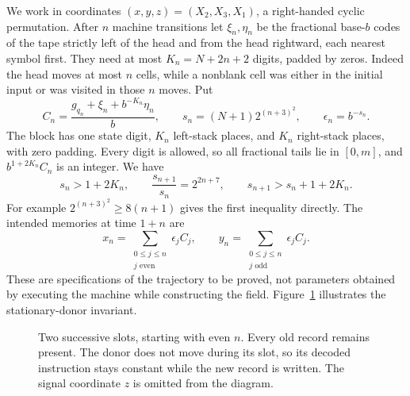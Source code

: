 We work in coordinates $(x,y,z)=(X_2,X_3,X_1)$, a right-handed cyclic
permutation.  After $n$ machine transitions let $\xi_n,\eta_n$ be the
fractional base-$b$ codes of the tape strictly left of the head and from
the head rightward, each nearest symbol first.  They need at most
$K_n=N+2n+2$ digits, padded by zeros.  Indeed the head moves at most
$n$ cells, while a nonblank cell was either in the initial input or was
visited in those $n$ moves.  Put
\begin{equation}
 C_n=\frac{g_{q_n}+\xi_n+b^{-K_n}\eta_n}{b},\qquad
 s_n=(N+1)2^{(n+3)^2},\qquad \epsilon_n=b^{-s_n}.
 \label{eq:alternating-block}
\end{equation}
The block has one state digit, $K_n$ left-stack places, and $K_n$
right-stack places, with zero padding. Every digit is allowed, so all
fractional tails lie in $[0,m]$, and
$b^{1+2K_n}C_n$ is an integer.  We have
\[
 s_n>1+2K_n,\qquad
 \frac{s_{n+1}}{s_n}=2^{2n+7},\qquad
 s_{n+1}>s_n+1+2K_n.
\]
For example $2^{(n+3)^2}\geq8(n+1)$ gives the first inequality directly.
The intended memories at time $1+n$ are
\begin{equation}
 x_n=\sum_{\substack{0\leq j\leq n\\j\text{ even}}}\epsilon_jC_j,
 \qquad
 y_n=\sum_{\substack{0\leq j\leq n\\j\text{ odd}}}\epsilon_jC_j.
 \label{eq:alternating-history}
\end{equation}
These are specifications of the trajectory to be proved, not parameters
obtained by executing the machine while constructing the field.
Figure~\ref{fig:alternating} illustrates the stationary-donor invariant.

\begin{figure}[ht]
\centering
{}
\caption{Two successive slots, starting with even $n$. Every old record
remains present. The donor does not move during its slot, so its decoded
instruction stays constant while the new record is written. The signal
coordinate $z$ is omitted from the diagram.}
\label{fig:alternating}
\end{figure}

